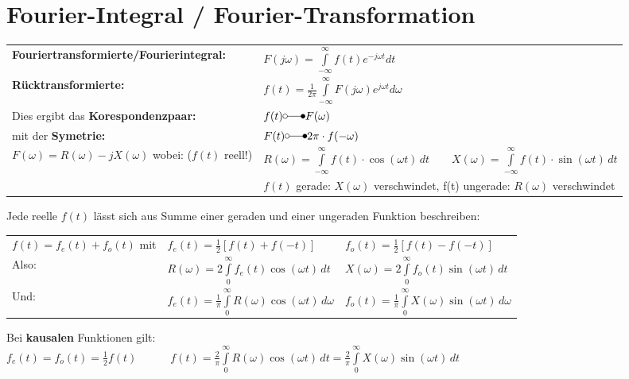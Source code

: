 \section{Fourier-Integral / Fourier-Transformation}
\begin{tabular}{|ll|}
\hline
\textbf{Fouriertransformierte/Fourierintegral:} &
$F(j\omega) = \int\limits_{-\infty}^{\infty} f(t)e^{-j\omega t}dt$ \\

\textbf{Rücktransformierte:} &
$f(t) = \frac{1}{2\pi}\int\limits_{-\infty}^{\infty}F(j\omega)e^{j\omega t}d\omega$ \\

Dies ergibt das \textbf{Korespondenzpaar:} & $f(t) \laplace F(\omega)$ \\
mit der \textbf{Symetrie:} & $F(t) \laplace 2\pi \cdot f(-\omega)$ \\

$F(\omega) = R(\omega) -jX(\omega)$ wobei: ($f(t)$ reell!) &
$R(\omega) = \int\limits_{-\infty}^\infty f(t)\cdot \cos(\omega t)\,dt \quad\quad X(\omega) =
\int\limits_{-\infty}^\infty f(t)\cdot \sin(\omega t)\,dt$
\\
&$f(t)$ gerade: $X(\omega)$ verschwindet, f(t) ungerade: $R(\omega)$ verschwindet \\
\hline
\end{tabular}

Jede reelle $f(t)$ lässt sich aus Summe einer geraden und einer ungeraden Funktion beschreiben:\\
\begin{tabular}{lll}
$f(t) = f_e(t) + f_o(t)$ mit & $f_e(t) = \frac{1}{2}[f(t) + f(-t)]$ & $f_o(t) = \frac{1}{2}[f(t) - f(-t)]$ \\

Also: & $R(\omega) = 2 \int\limits_0^\infty f_e(t) \cos(\omega t)\,dt$ & $X(\omega) = 2 \int\limits_0^\infty
f_o(t) \sin(\omega t)\,dt$ \\

Und: & $f_e(t) = \frac{1}{\pi}\int\limits_0^\infty R(\omega)\cos(\omega t)\,d\omega$ & 
$f_o(t) = \frac{1}{\pi}\int\limits_0^\infty X(\omega)\sin(\omega t)\,d\omega$ \\
\end{tabular}

Bei \textbf{kausalen} Funktionen gilt:\\
$f_e(t) = f_o(t) = \frac{1}{2}f(t) \quad \quad \quad
f(t) = \frac{2}{\pi}\int\limits_0^\infty R(\omega) \cos(\omega t)\,dt = \frac{2}{\pi}\int\limits_0^\infty X(\omega)
\sin(\omega t)\,dt$

